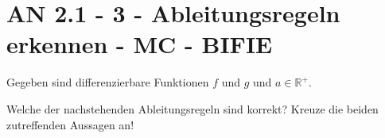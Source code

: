\section{AN 2.1 - 3 - Ableitungsregeln erkennen - MC - BIFIE}

\begin{beispiel}[AN 2.1]{1} %
				Gegeben sind differenzierbare Funktionen $f$ und $g$ und $a\in\mathbb{R^+}$.

Welche der nachstehenden Ableitungsregeln sind korrekt?
Kreuze die beiden zutreffenden Aussagen an!

\end{beispiel}